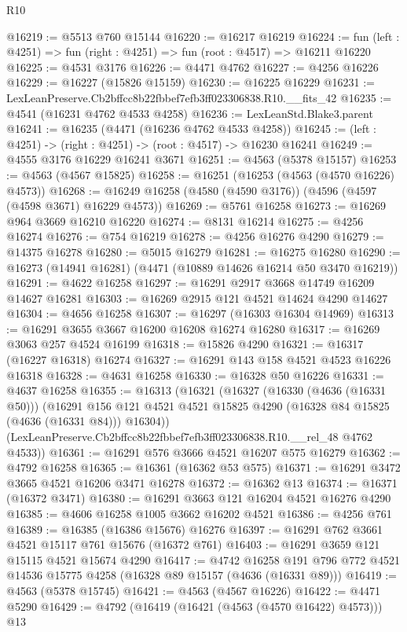 \begin{lexlean}{R10}
\begin{coremodule}
@16219 := @5513 @760 @15144
@16220 := @16217 @16219
@16224 := fun (left : @4251) => fun (right : @4251) => fun (root : @4517) => @16211 @16220
@16225 := @4531 @3176
@16226 := @4471 @4762
@16227 := @4256 @16226
@16229 := @16227 (@15826 @15159)
@16230 := @16225 @16229
@16231 := LexLeanPreserve.Cb2bffcc8b22fbbef7efb3ff023306838.R10.__fits_42
@16235 := @4541 (@16231 @4762 @4533 @4258)
@16236 := LexLeanStd.Blake3.parent
@16241 := @16235 (@4471 (@16236 @4762 @4533 @4258))
@16245 := (left : @4251) -> (right : @4251) -> (root : @4517) -> @16230 @16241
@16249 := @4555 @3176 @16229 @16241 @3671
@16251 := @4563 (@5378 @15157)
@16253 := @4563 (@4567 @15825)
@16258 := @16251 (@16253 (@4563 (@4570 @16226) @4573))
@16268 := @16249 @16258 (@4580 (@4590 @3176)) (@4596 (@4597 (@4598 @3671) @16229 @4573))
@16269 := @5761 @16258
@16273 := @16269 @964 @3669 @16210 @16220
@16274 := @8131 @16214
@16275 := @4256 @16274
@16276 := @754 @16219
@16278 := @4256 @16276 @4290
@16279 := @14375 @16278
@16280 := @5015 @16279
@16281 := @16275 @16280
@16290 := @16273 (@14941 @16281) (@4471 (@10889 @14626 @16214 @50 @3470 @16219))
@16291 := @4622 @16258
@16297 := @16291 @2917 @3668 @14749 @16209 @14627 @16281
@16303 := @16269 @2915 @121 @4521 @14624 @4290 @14627
@16304 := @4656 @16258
@16307 := @16297 (@16303 @16304 @14969)
@16313 := @16291 @3655 @3667 @16200 @16208 @16274 @16280
@16317 := @16269 @3063 @257 @4524 @16199
@16318 := @15826 @4290
@16321 := @16317 (@16227 @16318) @16274
@16327 := @16291 @143 @158 @4521 @4523 @16226 @16318
@16328 := @4631 @16258
@16330 := @16328 @50 @16226
@16331 := @4637 @16258
@16355 := @16313
    (@16321
      (@16327
        (@16330 (@4636 (@16331 @50)))
        (@16291 @156 @121 @4521 @4521 @15825 @4290 (@16328 @84 @15825 (@4636 (@16331 @84))) @16304))
      (LexLeanPreserve.Cb2bffcc8b22fbbef7efb3ff023306838.R10.__rel_48 @4762 @4533))
@16361 := @16291 @576 @3666 @4521 @16207 @575 @16279
@16362 := @4792 @16258
@16365 := @16361 (@16362 @53 @575)
@16371 := @16291 @3472 @3665 @4521 @16206 @3471 @16278
@16372 := @16362 @13
@16374 := @16371 (@16372 @3471)
@16380 := @16291 @3663 @121 @16204 @4521 @16276 @4290
@16385 := @4606 @16258 @1005 @3662 @16202 @4521
@16386 := @4256 @761
@16389 := @16385 (@16386 @15676) @16276
@16397 := @16291 @762 @3661 @4521 @15117 @761 @15676 (@16372 @761)
@16403 := @16291 @3659 @121 @15115 @4521 @15674 @4290
@16417 := @4742
    @16258
    @191
    @796
    @772
    @4521
    @14536
    @15775
    @4258
    (@16328 @89 @15157 (@4636 (@16331 @89)))
@16419 := @4563 (@5378 @15745)
@16421 := @4563 (@4567 @16226)
@16422 := @4471 @5290
@16429 := @4792 (@16419 (@16421 (@4563 (@4570 @16422) @4573))) @13

\end{coremodule}
\end{lexlean}
